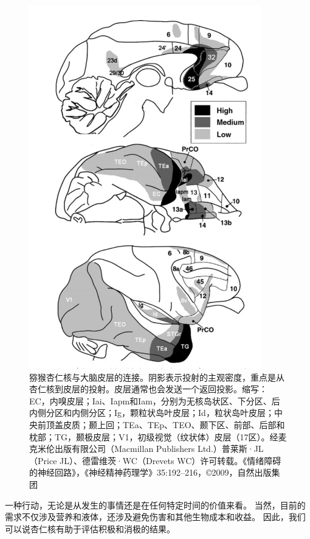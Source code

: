 \begin{figure}[!htb]
	\centering
	\includegraphics{image_pfc/Fig_3_3}
	\caption{猕猴杏仁核与大脑皮层的连接。阴影表示投射的主观密度，重点是从杏仁核到皮层的投射。皮层通常也会发送一个返回投影。缩写：EC，内嗅皮层；Iai、Iapm和Iam，分别为无核岛状区、下分区、后内侧分区和内侧分区；Ig，颗粒状岛叶皮层；Id，粒状岛叶皮层；中央前顶盖皮质；颞上回；TEa、TEp、TEO、颞下区、前部、后部和枕部；TG，颞极皮层；V1，初级视觉（纹状体）皮层（17区）。经麦克米伦出版有限公司（Macmillan Publishers Ltd.）普莱斯·JL（Price JL）、德雷维茨·WC（Drevets WC）许可转载。《情绪障碍的神经回路》，《神经精神药理学》35:192–216，©2009，自然出版集团}
	\label{fig:fig_3_3}
\end{figure}


一种行动，无论是从发生的事情还是在任何特定时间的价值来看。
当然，目前的需求不仅涉及营养和液体，还涉及避免伤害和其他生物成本和收益。
因此，我们可以说杏仁核有助于评估积极和消极的结果。\par


